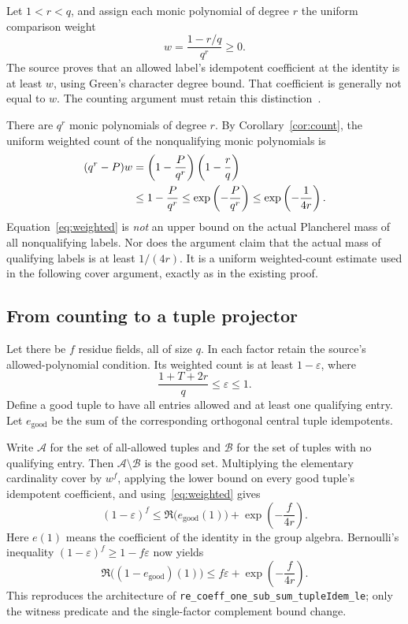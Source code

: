 \documentclass[11pt,a4paper]{article}
\newcommand{\src}[1]{\nolinkurl{#1}}
\theoremstyle{definition}
\theoremstyle{remark}
\begin{document}
Let $1<r<q$, and assign each monic polynomial of degree $r$ the uniform
comparison weight
\[
 w=\frac{1-r/q}{q^r}\ge0.
\]
The source proves that an allowed label's idempotent coefficient at the
identity is at least $w$, using Green's character degree bound. That
coefficient is generally not equal to $w$. The counting argument must
retain this distinction~\cite{badtypes}.

There are $q^r$ monic polynomials of degree $r$. By
Corollary~\ref{cor:count}, the uniform weighted count of the
nonqualifying monic polynomials is
\begin{align}
 (q^r-P)w
 &=\left(1-\frac{P}{q^r}\right)\left(1-\frac rq\right)\notag\\
 &\le1-\frac{P}{q^r}
 \le\exp\left(-\frac{P}{q^r}\right)
 \le\exp\left(-\frac1{4r}\right).
 \label{eq:weighted}
\end{align}
Equation~\eqref{eq:weighted} is \emph{not} an upper bound on the actual
Plancherel mass of all nonqualifying labels. Nor does the argument claim
that the actual mass of qualifying labels is at least $1/(4r)$.
It is a uniform weighted-count estimate used in the following cover
argument, exactly as in the existing proof.

\subsection{From counting to a tuple projector}

Let there be $f$ residue fields, all of size $q$. In each factor retain
the source's allowed-polynomial condition. Its weighted count is at least
$1-\varepsilon$, where
\begin{equation}
 \frac{1+T+2r}{q}\le\varepsilon\le1.
 \label{eq:epsilon}
\end{equation}
Define a good tuple to have all entries allowed and at least one
qualifying entry. Let $e_{\mathrm{good}}$ be the sum of the corresponding
orthogonal central tuple idempotents.

Write $\mathcal A$ for the set of all-allowed tuples and $\mathcal B$
for the set of tuples with no qualifying entry. Then
$\mathcal A\setminus\mathcal B$ is the good set. Multiplying the
elementary cardinality cover by $w^f$, applying the lower bound on every
good tuple's idempotent coefficient, and using~\eqref{eq:weighted} gives
\[
 (1-\varepsilon)^f
 \le \Re\bigl(e_{\mathrm{good}}(1)\bigr)
       +\exp\left(-\frac f{4r}\right).
\]
Here $e(1)$ means the coefficient of the identity in the group algebra.
Bernoulli's inequality $(1-\varepsilon)^f\ge1-f\varepsilon$ now yields
\begin{equation}
 \boxed{\ \Re\bigl((1-e_{\mathrm{good}})(1)\bigr)
 \le f\varepsilon+\exp\left(-\frac f{4r}\right).\ }
 \label{eq:projector}
\end{equation}
This reproduces the architecture of
\src{re_coeff_one_sub_sum_tupleIdem_le}; only the witness predicate and
the single-factor complement bound change.
\end{document}
